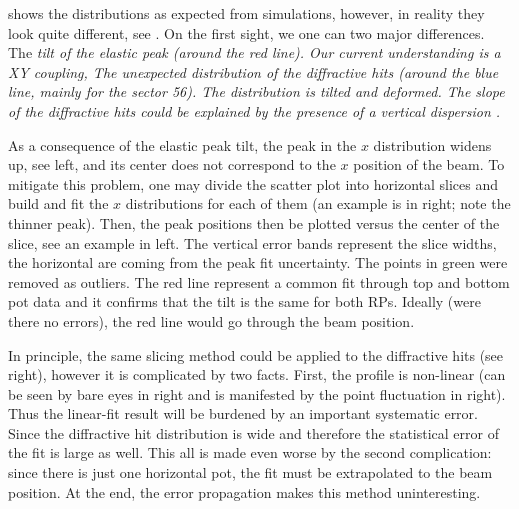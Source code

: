  shows the distributions as expected from simulations, however, in reality they look quite different, see . On the first sight, we one can two major differences.
\bitm
\itm The \em{tilt of the elastic peak} (around the red line). Our current understanding is a XY coupling, 
\itm The unexpected distribution of the diffractive hits (around the blue line, mainly for the sector 56). The distribution is tilted and deformed. The slope of the diffractive hits could be explained by the presence of a vertical dispersion .
\eitm

As a consequence of the elastic peak tilt, the peak in the $x$ distribution widens up, see  left, and its center does not correspond to the $x$ position of the beam. To mitigate this problem, one may divide the scatter plot into horizontal slices and build and fit the $x$ distributions for each of them (an example is in  right; note the thinner peak). Then, the peak positions then be plotted versus the center of the slice, see an example in  left. The vertical error bands represent the slice widths, the horizontal are coming from the peak fit uncertainty. The points in green were removed as outliers. The red line represent a common fit through top and bottom pot data and it confirms that the tilt is the same for both RPs. Ideally (were there no errors), the red line would go through the beam position.

In principle, the same slicing method could be applied to the diffractive hits (see  right), however it is complicated by two facts. First, the profile is non-linear (can be seen by bare eyes in  right and is manifested by the point fluctuation in  right). Thus the linear-fit result will be burdened by an important systematic error. Since the diffractive hit distribution is wide and therefore the statistical error of the fit is large as well. This all is made even worse by the second complication: since there is just one horizontal pot, the fit must be extrapolated to the beam position. At the end, the error propagation makes this method uninteresting.



